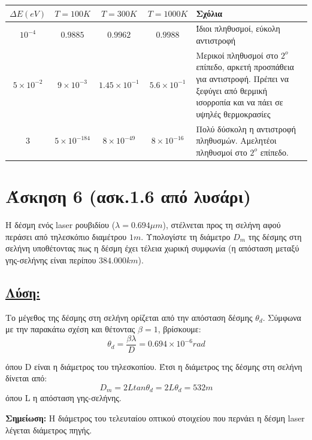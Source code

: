 \documentclass[a4paper,11pt,titlepage]{article}
\numberwithin{equation}{section} %
\begin{document}
\begin{table}[h!]
\begin{center}
    \begin{tabular}{ | c | c | c | c | p{5cm} |}
    \hline
     ${\Delta}E (eV)$	& $T=100K$		& $T=300K$ 		& $T=1000K$		& Σχόλια\\ \hline
     $10^{-4}$		& $0.9885$		& $0.9962$		& $0.9988$		& Ίδιοι πληθυσμοί, εύκολη αντιστροφή\\ \hline
     $5\times10^{-2}$	& $9\times10^{-3}$	& $1.45\times10^{-1}$	& $5.6\times10^{-1}$	& Μερικοί πληθυσμοί στο $2^ο$ επίπεδο, αρκετή προσπάθεια για αντιστροφή. Πρέπει να ξεφύγει από θερμική ισορροπία και να πάει σε υψηλές θερμοκρασίες\\ \hline
     $3$ & $5\times10^{-184}$	& $8\times10^{-49}$	& $8\times10^{-16}$	& Πολύ δύσκολη η αντιστροφή πληθυσμών. Αμελητέοι πληθυσμοί στο $2^ο$ επίπεδο.\\ \hline
    \end{tabular}
\end{center}
\end{table}
\newpage
\section{Άσκηση 6 (ασκ.1.6 από λυσάρι)}

Η δέσμη ενός laser ρουβιδίου ($\lambda=0.694{\mu}m$), στέλνεται προς τη σελήνη αφού περάσει από τηλεσκόπιο διαμέτρου $1m$. Υπολογίστε τη διάμετρο $D_m$ της δέσμης στη σελήνη υποθέτοντας πως η δέσμη έχει τέλεια χωρική συμφωνία (η απόσταση μεταξύ γης-σελήνης είναι περίπου $384.000km$).
\subsection*{\underline{Λύση:}}

Το μέγεθος της δέσμης στη σελήνη ορίζεται από την απόσταση δέσμης $\theta_d$. Σύμφωνα με την παρακάτω σχέση και θέτοντας $\beta=1$, βρίσκουμε:
\begin{equation}
 \theta_d=\frac{\beta\lambda}{D}=0.694\times10^{-6} rad
\end{equation}

όπου D είναι η διάμετρος του τηλεσκοπίου. Έτσι η διάμετρος της δέσμης στη σελήνη δίνεται από:
\begin{equation}
 D_m=2Ltan{\theta_d}=2L\theta_d=532m
\end{equation}
όπου L η απόσταση γης-σελήνης.

\textbf{Σημείωση:} Η διάμετρος του τελευταίου οπτικού στοιχείου που περνάει η δέσμη laser λέγεται διάμετρος πηγής.
\end{document}

